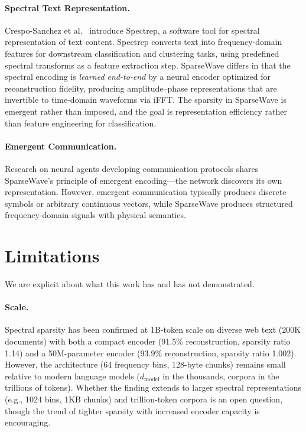 \documentclass[10pt,twocolumn]{article}
\begin{document}
\paragraph{Spectral Text Representation.} Crespo-Sanchez et al.\ \cite{cresposanchez2024spectrep} introduce Spectrep, a software tool for spectral representation of text content. Spectrep converts text into frequency-domain features for downstream classification and clustering tasks, using predefined spectral transforms as a feature extraction step. SparseWave differs in that the spectral encoding is \emph{learned end-to-end} by a neural encoder optimized for reconstruction fidelity, producing amplitude--phase representations that are invertible to time-domain waveforms via iFFT. The sparsity in SparseWave is emergent rather than imposed, and the goal is representation efficiency rather than feature engineering for classification.

\paragraph{Emergent Communication.} Research on neural agents developing communication protocols \cite{lazaridou2017multi} shares SparseWave's principle of emergent encoding---the network discovers its own representation. However, emergent communication typically produces discrete symbols or arbitrary continuous vectors, while SparseWave produces structured frequency-domain signals with physical semantics.

\section{Limitations}
\label{sec:limitations}

We are explicit about what this work has and has not demonstrated.

\paragraph{Scale.} Spectral sparsity has been confirmed at 1B-token scale on diverse web text (200K documents) with both a compact encoder (91.5\% reconstruction, sparsity ratio 1.14) and a 50M-parameter encoder (93.9\% reconstruction, sparsity ratio 1.002). However, the architecture (64 frequency bins, 128-byte chunks) remains small relative to modern language models ($d_\text{model}$ in the thousands, corpora in the trillions of tokens). Whether the finding extends to larger spectral representations (e.g., 1024 bins, 1KB chunks) and trillion-token corpora is an open question, though the trend of tighter sparsity with increased encoder capacity is encouraging.
\end{document}
